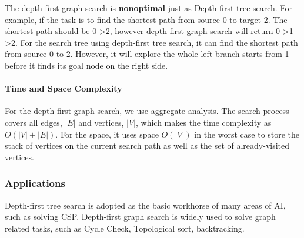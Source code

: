 \documentclass[main.tex]{subfiles}
\begin{document}
The depth-first graph search is \textbf{nonoptimal} just as Depth-first tree search. For example, if the task is to find the shortest path from source 0 to target 2. The shortest path should be 0->2, however depth-first graph search will return 0->1->2. For the search tree using depth-first tree search, it can find the shortest path from source 0 to 2. However, it will explore the whole left branch starts from 1 before it finds its goal node on the right side. 

\paragraph{Time and Space Complexity}   For the depth-first graph search, we use aggregate analysis. The search process covers all edges, $|E|$ and vertices, $|V|$, which makes the time complexity as $O(|V|+|E|)$. For the space, it uses space $O(|V|)$ in the worst case to
store the stack of vertices on the current search path as well as the set of
already-visited vertices.

\subsubsection{Applications} Depth-first tree search is adopted as the basic workhorse of many areas of AI, such as solving CSP. Depth-first graph search is widely used to solve graph related tasks, such as Cycle Check, Topological sort, backtracking. 
\end{document}
